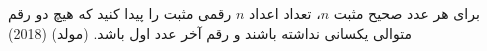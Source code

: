برای هر عدد صحیح مثبت $n$، تعداد اعداد $n$ رقمی مثبت را پیدا کنید که 
هیچ دو رقم متوالی یکسانی نداشته باشند و رقم آخر عدد اول باشد. (مولد)
(2018)